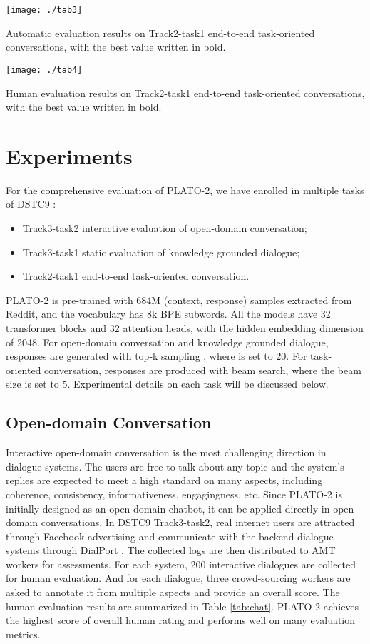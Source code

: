 \documentclass[letterpaper]{article} \usepackage{aaai21}  \usepackage{times}  \usepackage{helvet} \usepackage{courier}  \usepackage[hyphens]{url}  \usepackage{graphicx} \urlstyle{rm} \def\UrlFont{\rm}  \usepackage{natbib}  \usepackage{caption} \frenchspacing  \setlength{\pdfpagewidth}{8.5in}  \setlength{\pdfpageheight}{11in}  \usepackage{amsmath}
\begin{document}
\begin{table*}
	\centering
	\texttt{[image: ./tab3]}
	\caption{Automatic evaluation results on Track2-task1 end-to-end task-oriented conversations, with the best value written in bold.}
	\label{tab:task_auto}
\end{table*} 
\begin{table*}
	\centering
	\texttt{[image: ./tab4]}
	\caption{Human evaluation results on Track2-task1 end-to-end task-oriented conversations, with the best value written in bold.}
	\label{tab:task_human}
\end{table*} 
\section{Experiments}
For the comprehensive evaluation of PLATO-2, we have enrolled in multiple tasks of DSTC9 \cite{gunasekara2020overview}:
\begin{itemize}
    \item Track3-task2 interactive evaluation of open-domain conversation;
    \item Track3-task1 static evaluation of knowledge grounded dialogue;
    \item Track2-task1 end-to-end task-oriented conversation.
\end{itemize}
PLATO-2 is pre-trained with 684M (context, response) samples extracted from Reddit, and the vocabulary has 8k BPE subwords. All the models have 32 transformer blocks and 32 attention heads, with the hidden embedding dimension of 2048. For open-domain conversation and knowledge grounded dialogue, responses are generated with top-k sampling \cite{fan2018hierarchical}, where  is set to 20. For task-oriented conversation, responses are produced with beam search, where the beam size is set to 5. Experimental details on each task will be discussed below.

\subsection{Open-domain Conversation}
Interactive open-domain conversation is the most challenging direction in dialogue systems. The users are free to talk about any topic and the system's replies are expected to meet a high standard on many aspects, including coherence, consistency, informativeness, engagingness, etc. Since PLATO-2 is initially designed as an open-domain chatbot, it can be applied directly in open-domain conversations. In DSTC9 Track3-task2, real internet users are attracted through Facebook advertising and communicate with the backend dialogue systems through DialPort \cite{zhao2016dialport}. The collected logs are then distributed to AMT workers for assessments. For each system, 200 interactive dialogues are collected for human evaluation. And for each dialogue, three crowd-sourcing workers are asked to annotate it from multiple aspects and provide an overall score. The human evaluation results are summarized in Table \ref{tab:chat}. PLATO-2 achieves the highest score of overall human rating and performs well on many evaluation metrics.
\end{document}
